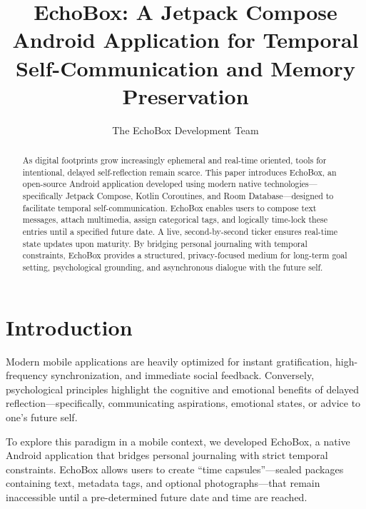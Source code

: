 \documentclass[manuscript,screen]{acmart}
\begin{document}
\title{EchoBox: A Jetpack Compose Android Application for Temporal Self-Communication and Memory Preservation}

\author{The EchoBox Development Team}

\begin{abstract}
As digital footprints grow increasingly ephemeral and real-time oriented, tools for intentional, delayed self-reflection remain scarce. This paper introduces EchoBox, an open-source Android application developed using modern native technologies---specifically Jetpack Compose, Kotlin Coroutines, and Room Database---designed to facilitate temporal self-communication. EchoBox enables users to compose text messages, attach multimedia, assign categorical tags, and logically time-lock these entries until a specified future date. A live, second-by-second ticker ensures real-time state updates upon maturity. By bridging personal journaling with temporal constraints, EchoBox provides a structured, privacy-focused medium for long-term goal setting, psychological grounding, and asynchronous dialogue with the future self.
\end{abstract}

\maketitle

\section{Introduction}
Modern mobile applications are heavily optimized for instant gratification, high-frequency synchronization, and immediate social feedback. Conversely, psychological principles highlight the cognitive and emotional benefits of delayed reflection---specifically, communicating aspirations, emotional states, or advice to one's future self.

To explore this paradigm in a mobile context, we developed EchoBox, a native Android application that bridges personal journaling with strict temporal constraints. EchoBox allows users to create ``time capsules''---sealed packages containing text, metadata tags, and optional photographs---that remain inaccessible until a pre-determined future date and time are reached.
\end{document}
